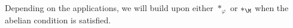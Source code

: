 




Depending on the applications, we will build upon either $\ast_{\varphi}$ or $\ast_{\M}$ when the abelian condition is satisfied.
